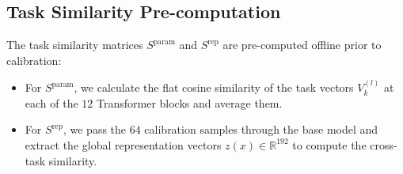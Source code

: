 \documentclass{article}
\theoremstyle{plain}
\theoremstyle{definition}
\theoremstyle{remark}
\begin{document}
\subsection{Task Similarity Pre-computation}
The task similarity matrices $S^{\text{param}}$ and $S^{\text{rep}}$ are pre-computed offline prior to calibration:
\begin{itemize}
    \item For $S^{\text{param}}$, we calculate the flat cosine similarity of the task vectors $V_k^{(l)}$ at each of the $12$ Transformer blocks and average them.
    \item For $S^{\text{rep}}$, we pass the $64$ calibration samples through the base model and extract the global representation vectors $z(x) \in \mathbb{R}^{192}$ to compute the cross-task similarity.
\end{itemize}
\end{document}
